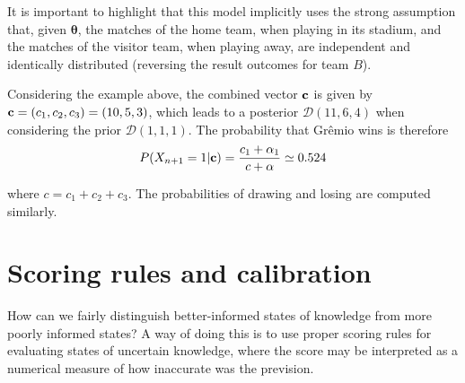 \documentclass[journal,article,accept,moreauthors,pdftex,12pt,a4paper]{mdpi}
\begin{document}
It is important to highlight that this model implicitly uses the strong assumption that, given $\boldsymbol{\theta}$, the matches of the home team, when playing in its stadium, and the matches of the visitor team, when playing away, are independent and identically distributed (reversing the result outcomes for team $B$).

Considering the example above, the combined vector ${\bf c}$ is given by ${\bf c}=(c_1,c_2,c_3)=(10,5,3)$, which leads to a posterior $\mathcal{D}(11,6,4)$ when considering the prior $\mathcal{D}(1,1,1)$.
The probability that Gr\^emio wins is therefore	
\[P(X_{n+1}=1|{\bf c})=\frac{c_1+\alpha_1}{c+\alpha}\simeq0.524
\]

\noindent
where $c=c_1+c_2+c_3$. The probabilities of drawing and losing are computed similarly.

\section{Scoring rules and calibration}
\label{sec::scoring}

How can we fairly distinguish better-informed states of knowledge from more poorly informed states?
A way of doing this is to use proper scoring rules for evaluating states of uncertain knowledge, where
the score may be interpreted as a numerical measure of how inaccurate was the prevision.



\end{document}
